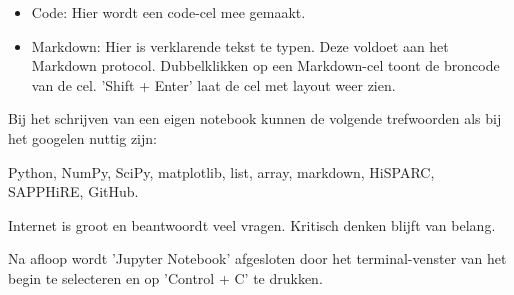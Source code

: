 \begin{itemize}
\item Code: Hier wordt een code-cel mee gemaakt.
\item Markdown: Hier is verklarende tekst te typen. Deze voldoet aan het Markdown protocol. Dubbelklikken op een Markdown-cel
toont de broncode van de cel. 'Shift + Enter' laat de cel met layout weer zien.
\end{itemize}

Bij het schrijven van een eigen notebook kunnen de volgende trefwoorden als bij het googelen nuttig zijn:

Python, NumPy, SciPy, matplotlib, list, array, markdown, HiSPARC, SAPPHiRE, GitHub.

Internet is groot en beantwoordt veel vragen. Kritisch denken blijft van belang.

Na afloop wordt 'Jupyter Notebook' afgesloten door
het terminal-venster van het begin te selecteren en op 'Control + C' te drukken.


